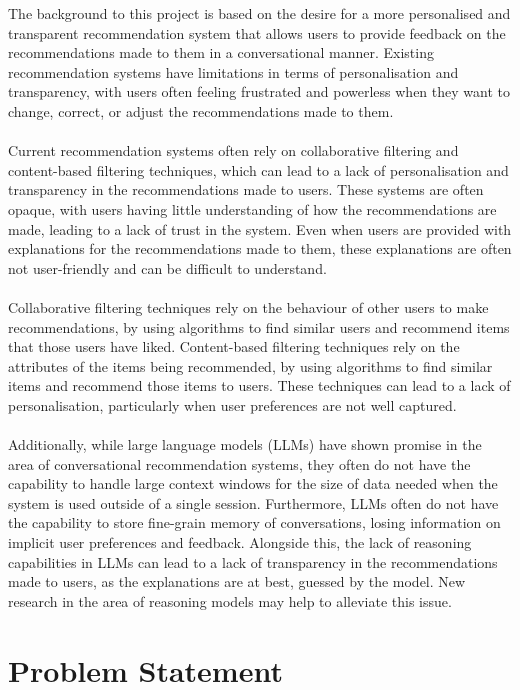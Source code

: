The background to this project is based on the desire for a more personalised and transparent recommendation system that allows users to provide feedback on the recommendations made to them in a conversational manner. Existing recommendation systems have limitations in terms of personalisation and transparency, with users often feeling frustrated and powerless when they want to change, correct, or adjust the recommendations made to them.
\\\\
Current recommendation systems often rely on collaborative filtering and content-based filtering techniques, which can lead to a lack of personalisation and transparency in the recommendations made to users. These systems are often opaque, with users having little understanding of how the recommendations are made, leading to a lack of trust in the system. Even when users are provided with explanations for the recommendations made to them, these explanations are often not user-friendly and can be difficult to understand.
\\\\
Collaborative filtering techniques rely on the behaviour of other users to make recommendations, by using algorithms to find similar users and recommend items that those users have liked. Content-based filtering techniques rely on the attributes of the items being recommended, by using algorithms to find similar items and recommend those items to users. These techniques can lead to a lack of personalisation, particularly when user preferences are not well captured.
\\\\
Additionally, while large language models (LLMs) have shown promise in the area of conversational recommendation systems, they often do not have the capability to handle large context windows for the size of data needed when the system is used outside of a single session. Furthermore, LLMs often do not have the capability to store fine-grain memory of conversations, losing information on implicit user preferences and feedback. Alongside this, the lack of reasoning capabilities in LLMs can lead to a lack of transparency in the recommendations made to users, as the explanations are at best, guessed by the model. New research in the area of reasoning models may help to alleviate this issue\cite{zhu2025collaborativeretrievallargelanguage}.

\section{Problem Statement}
\label{sec:problem_statement}

